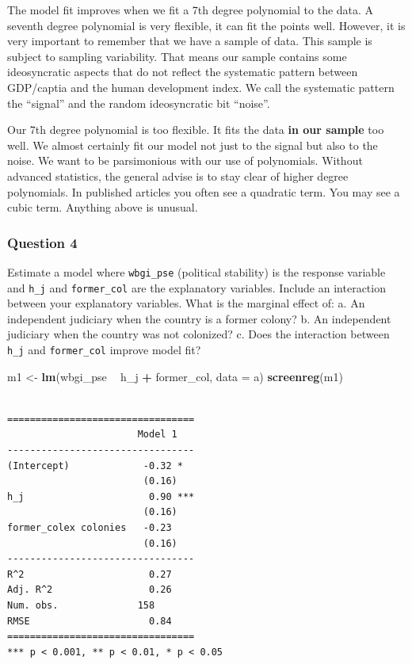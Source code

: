 \documentclass[]{article}
\newenvironment{Shaded}{\begin{snugshade}}{\end{snugshade}}
\newcommand{\KeywordTok}[1]{\textcolor[rgb]{0.13,0.29,0.53}{\textbf{#1}}}
\newcommand{\DataTypeTok}[1]{\textcolor[rgb]{0.13,0.29,0.53}{#1}}
\newcommand{\StringTok}[1]{\textcolor[rgb]{0.31,0.60,0.02}{#1}}
\newcommand{\OperatorTok}[1]{\textcolor[rgb]{0.81,0.36,0.00}{\textbf{#1}}}
\newcommand{\NormalTok}[1]{#1}
\theoremstyle{definition}
\theoremstyle{definition}
\theoremstyle{definition}
\theoremstyle{remark}
\begin{document}
The model fit improves when we fit a 7th degree polynomial to the data.
A seventh degree polynomial is very flexible, it can fit the points
well. However, it is very important to remember that we have a sample of
data. This sample is subject to sampling variability. That means our
sample contains some ideosyncratic aspects that do not reflect the
systematic pattern between GDP/captia and the human development index.
We call the systematic pattern the ``signal'' and the random
ideosyncratic bit ``noise''.

Our 7th degree polynomial is too flexible. It fits the data \textbf{in
our sample} too well. We almost certainly fit our model not just to the
signal but also to the noise. We want to be parsimonious with our use of
polynomials. Without advanced statistics, the general advise is to stay
clear of higher degree polynomials. In published articles you often see
a quadratic term. You may see a cubic term. Anything above is unusual.

\subsubsection{Question 4}\label{question-4}

Estimate a model where \texttt{wbgi\_pse} (political stability) is the
response variable and \texttt{h\_j} and \texttt{former\_col} are the
explanatory variables. Include an interaction between your explanatory
variables. What is the marginal effect of: a. An independent judiciary
when the country is a former colony? b. An independent judiciary when
the country was not colonized? c. Does the interaction between
\texttt{h\_j} and \texttt{former\_col} improve model fit?

\begin{Shaded}
\begin{Highlighting}[]
\NormalTok{m1 <-}\StringTok{ }\KeywordTok{lm}\NormalTok{(wbgi_pse }\OperatorTok{~}\StringTok{ }\NormalTok{h_j }\OperatorTok{+}\StringTok{ }\NormalTok{former_col, }\DataTypeTok{data =}\NormalTok{ a)}
\KeywordTok{screenreg}\NormalTok{(m1)}
\end{Highlighting}
\end{Shaded}

\begin{verbatim}

=================================
                       Model 1   
---------------------------------
(Intercept)             -0.32 *  
                        (0.16)   
h_j                      0.90 ***
                        (0.16)   
former_colex colonies   -0.23    
                        (0.16)   
---------------------------------
R^2                      0.27    
Adj. R^2                 0.26    
Num. obs.              158       
RMSE                     0.84    
=================================
*** p < 0.001, ** p < 0.01, * p < 0.05
\end{verbatim}
\end{document}
